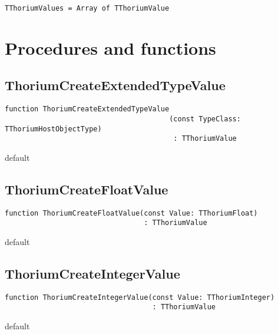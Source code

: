 \begin{verbatim}
TThoriumValues = Array of TThoriumValue
\end{verbatim}
\label{thoriumcorepkg:thorium:tthoriumvalues}


\section{Procedures and functions}
\label{thoriumfunctions}
\subsection{ThoriumCreateExtendedTypeValue}
\label{thoriumcorepkg:thorium:thoriumcreateextendedtypevalue}
\begin{FPCList}
\Declaration 

\begin{verbatim}
function ThoriumCreateExtendedTypeValue
                                       (const TypeClass: TThoriumHostObjectType)
                                        : TThoriumValue
\end{verbatim}
\Visibility
default
\end{FPCList}
\subsection{ThoriumCreateFloatValue}
\label{thoriumcorepkg:thorium:thoriumcreatefloatvalue}
\begin{FPCList}
\Declaration 

\begin{verbatim}
function ThoriumCreateFloatValue(const Value: TThoriumFloat)
                                 : TThoriumValue
\end{verbatim}
\Visibility
default
\end{FPCList}
\subsection{ThoriumCreateIntegerValue}
\label{thoriumcorepkg:thorium:thoriumcreateintegervalue}
\begin{FPCList}
\Declaration 

\begin{verbatim}
function ThoriumCreateIntegerValue(const Value: TThoriumInteger)
                                   : TThoriumValue
\end{verbatim}
\Visibility
default
\end{FPCList}
